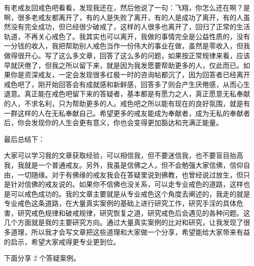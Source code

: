 \documentclass{ctexart}
\begin{document}
有老戒友回戒色吧看看，发现我还在，然后他说了一句：飞翔，你怎么还在啊？是啊，很多老戒友都离开了，有的人是失败了离开，有的人是成功了离开，有的人虽然没有完全成功，但已经很少破戒了，这样的人很多也离开了，回归了正常的生活轨道，不再关心戒色了。我其实也可以离开，我做的事情完全是公益性质的，没有一分钱的收入，我把帮助别人戒色当作一份伟大的事业在做，虽然是零收入，但我做得很开心。写了这么多文章，回答了这么多的问题，如果按正常规律来看，应该早就厌倦了，但我之所以留下来，就是因为我发愿要帮助更多的人，仅此而已。如果你是资深戒友，一定会发现很多红极一时的咨询帖都沉了，因为回答者已经离开戒色吧了，刚开始回答会有成就感和新鲜感，回答多了则会产生厌倦感，从而心生退意。真正能在戒色吧留下来的答疑者，基本都是有愿力之人，真正愿意无私奉献的人，不求名利，只为帮助更多的人。戒色吧之所以能有现在的良好氛围，就是有一群这样的人在无私奉献自己。希望更多的戒友能成为奉献者，成为无私的奉献者后，你会发现你的人生会更有意义，你也会变得更加豁达和充满正能量。

最后总结下：

大家可以学习我的文章获取经验，可以相信我，但不要迷信我，也不要盲目抬高我，我就是一个普通戒友。另外，我虽是信佛之人，但不会勉强大家信佛，信仰自由，一切随缘。对于有佛缘的戒友我会在答疑里说到佛教，也曾经说过放生，但只是针对信佛的戒友说的。如果你不信佛也没关系，可以走专业戒色的道路，这样也是可以戒色成功的。我的文章主要就是从专业戒色这个角度去阐述的，我走的就是专业戒色这条道路，在大量真实案例的基础上进行研究工作，研究手淫的具体危害，研究戒色规律和破戒规律，研究恢复之道，研究戒色后会遇见的各种问题。这几个方面就是我的主要研究方向。通过大量真实案例的比对和研究，让我发现了很多道理，所以我才会写文章把这些道理和大家做一个分享，希望能给大家带来有益的启示，希望大家戒得更专业更到位。

下面分享 2 个答疑案例。
\end{document}
